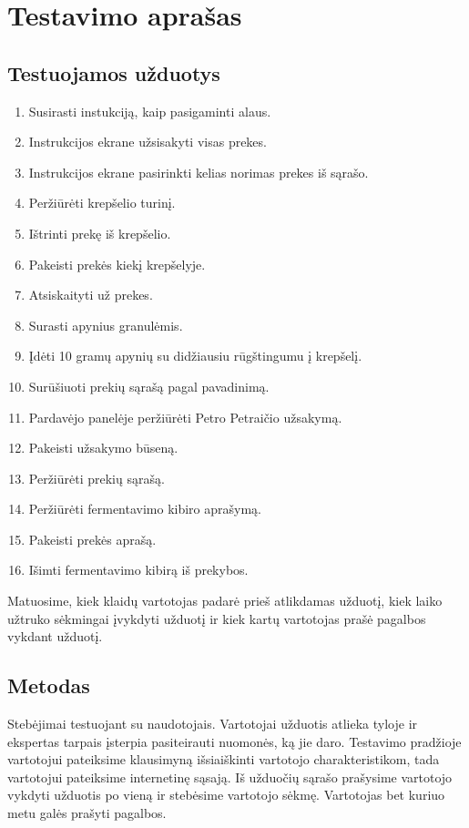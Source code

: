 \documentclass[oneside]{VUMIFPSkursinis}
\begin{document}
\section{Testavimo aprašas}
	\subsection{Testuojamos užduotys}
		\begin{enumerate}
			\item{Susirasti instukciją, kaip pasigaminti alaus.}
			\item{Instrukcijos ekrane užsisakyti visas prekes.}
			\item{Instrukcijos ekrane pasirinkti kelias norimas prekes iš sąrašo.}
			\item{Peržiūrėti krepšelio turinį.}
			\item{Ištrinti prekę iš krepšelio.}
			\item{Pakeisti prekės kiekį krepšelyje.}
			\item{Atsiskaityti už prekes.}
			\item{Surasti apynius granulėmis.}
			\item{Įdėti 10 gramų apynių su didžiausiu rūgštingumu į krepšelį.}
			\item{Surūšiuoti prekių sąrašą pagal pavadinimą.}
			\item{Pardavėjo panelėje peržiūrėti Petro Petraičio užsakymą.}
			\item{Pakeisti užsakymo būseną.}
			\item{Peržiūrėti prekių sąrašą.}
			\item{Peržiūrėti fermentavimo kibiro aprašymą.}
			\item{Pakeisti prekės aprašą.}
			\item{Išimti fermentavimo kibirą iš prekybos.}
		\end{enumerate}
		Matuosime, kiek klaidų vartotojas padarė prieš atlikdamas užduotį, kiek laiko užtruko sėkmingai įvykdyti užduotį ir kiek kartų vartotojas prašė pagalbos vykdant užduotį.
	\subsection{Metodas}
		Stebėjimai testuojant su naudotojais. Vartotojai užduotis atlieka tyloje ir ekspertas tarpais įsterpia pasiteirauti nuomonės, ką jie daro. Testavimo pradžioje vartotojui pateiksime klausimyną išsiaiškinti vartotojo charakteristikom, tada vartotojui pateiksime internetinę sąsają. Iš užduočių sąrašo prašysime vartotojo vykdyti užduotis po vieną ir stebėsime vartotojo sėkmę. Vartotojas bet kuriuo metu galės prašyti pagalbos. 
\end{document}
